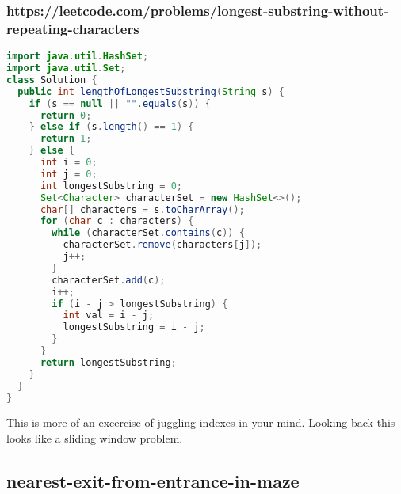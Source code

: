 \documentclass[12pt]{article}
\begin{document}
\subsubsection{https://leetcode.com/problems/longest-substring-without-repeating-characters}
\begin{lstlisting}[language=Java]
import java.util.HashSet;
import java.util.Set;
class Solution {
  public int lengthOfLongestSubstring(String s) {
    if (s == null || "".equals(s)) {
      return 0;
    } else if (s.length() == 1) {
      return 1;
    } else {
      int i = 0;
      int j = 0;
      int longestSubstring = 0;
      Set<Character> characterSet = new HashSet<>();
      char[] characters = s.toCharArray();
      for (char c : characters) {
        while (characterSet.contains(c)) {
          characterSet.remove(characters[j]);
          j++;
        }
        characterSet.add(c);
        i++;
        if (i - j > longestSubstring) {
          int val = i - j;
          longestSubstring = i - j;
        }
      }
      return longestSubstring;
    }
  }
}
\end{lstlisting}

This is more of an excercise of juggling indexes in your mind.
Looking back this looks like a sliding window problem.

\subsection{nearest-exit-from-entrance-in-maze} 
\end{document}

